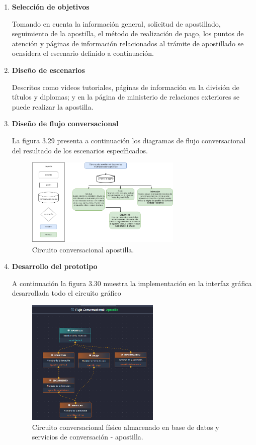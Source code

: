 \documentclass[letter, openright, 12pt]{book}
\begin{document}
{\begin{enumerate}[label=(\alph*)]
	\item \textbf{Selección de objetivos}
	\par Tomando en cuenta la información general, solicitud de apostillado, seguimiento de la apostilla, el método de realización de pago, los puntos de atención y páginas de información relacionados al trámite de apostillado se ocnsidera el escenario definido a continuación.  
	
	\item \textbf{Diseño de escenarios}
	\par Descritos como videos tutoriales, páginas de información en la división de títulos y diplomas; y en la página de ministerio de relaciones exteriores se puede realizar la apostilla.
	
	\item \textbf{Diseño de flujo conversacional}
	
	\par La figura 3.29 presenta a continuación los diagramas de flujo conversacional del resultado de los escenarios específicados. 
	\begin{figure}[H]
\centering
\includegraphics[width=0.7\textwidth]{figura3_29}
 \caption{Circuito conversacional apostilla.  }
\label{fig:figura3_29}
\end{figure}
	
	\item \textbf{Desarrollo del prototipo}
	\par A continuación la figura 3.30 muestra la implementación en la interfaz gráfica desarrollada todo el circuito gráfico
	\begin{figure}[H]
\centering
\includegraphics[width=0.6\textwidth]{figura3_30}
 \caption{Circuito conversacional físico almacenado en base de datos y servicios de conversación - apostilla.  }
\label{fig:figura3_30}
\end{figure}


\end{enumerate}}
\end{document}
